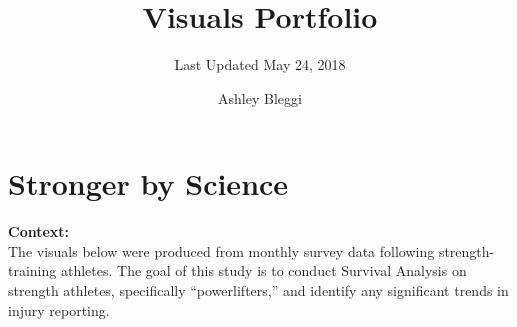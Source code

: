 \documentclass[]{article}
\title{Visuals Portfolio}
\subtitle{Last Updated May 24, 2018}
\author{Ashley Bleggi}
\date{}
\begin{document}
\maketitle

{
\setcounter{tocdepth}{4}
\tableofcontents
}
\section{Stronger by Science}\label{stronger-by-science}

\textbf{Context:}\\
The visuals below were produced from monthly survey data following
strength-training athletes. The goal of this study is to conduct
Survival Analysis on strength athletes, specifically ``powerlifters,''
and identify any significant trends in injury reporting.
\end{document}
